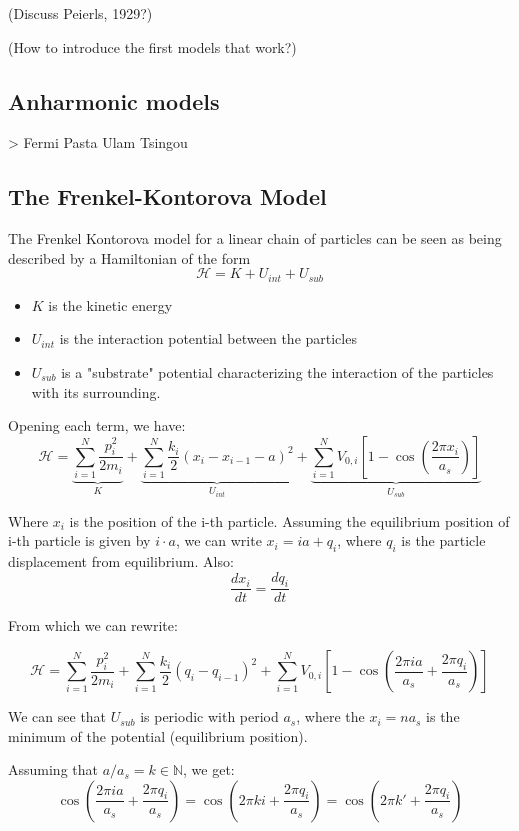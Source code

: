 (Discuss Peierls, 1929?)

(How to introduce the first models that work?)

\subsection{Anharmonic models}

> Fermi Pasta Ulam Tsingou

\subsection{The Frenkel-Kontorova Model}

The Frenkel Kontorova model for a linear chain of particles can be seen as being described by a Hamiltonian of the form 
\[ \mathcal{H} = K + U_{int} + U_{sub} \]

\begin{itemize}
	\item $ K $ is the kinetic energy
	\item $ U_{int} $ is the interaction potential between the particles
	\item $ U_{sub} $ is a "substrate" potential characterizing the interaction of the particles with its surrounding.
\end{itemize}

Opening each term, we have:
\[ 
\mathcal{H} = \underbrace{\sum_{i=1}^{N}\frac{p_{i}^{2}}{2m_i}}_{K} + 
\underbrace{\sum_{i=1}^{N} \frac{k_i}{2}(x_{i} - x_{i-1} - a)^{2}}_{U_{int}} +
\underbrace{\sum_{i=1}^{N} V_{0,i}\left[1 - \cos \left( \frac{2\pi x_{i}}{a_{s}}\right)\right]}_{U_{sub}}
\]

Where $ x_i $ is the position of the i-th particle. Assuming the equilibrium position of i-th particle is given by $ i\cdot a $, we can write $ x_i = ia + q_{i}$, where $ q_{i} $ is the particle displacement from equilibrium. Also:
\[ \frac{dx_{i}}{dt} =  \frac{dq_{i}}{dt}\]

From which we can rewrite:

\[ 
\mathcal{H} = \sum_{i=1}^{N}\frac{p_{i}^{2}}{2m_i} + 
\sum_{i=1}^{N} \frac{k_i}{2}(q_{i} - q_{i-1})^{2} +
\sum_{i=1}^{N} V_{0,i}\left[1 - 
\cos \left( \frac{2\pi i a}{a_{s}} + \frac{2\pi q_{i}}{a_{s}}\right)\right]
\]

We can see that $ U_{sub} $ is periodic with period $ a_s $, where the $ x_i = n a_s $ is the minimum of the potential (equilibrium position).

Assuming that $ a/a_s = k\in \mathbb{N} $, we get:
\[ 
\cos \left( \frac{2\pi i a}{a_{s}} + \frac{2\pi q_{i}}{a_{s}}\right) = 
\cos \left( 2\pi k i  + \frac{2\pi q_{i}}{a_{s}}\right) = 
\cos \left( 2\pi k'  + \frac{2\pi q_{i}}{a_{s}}\right)
\]

